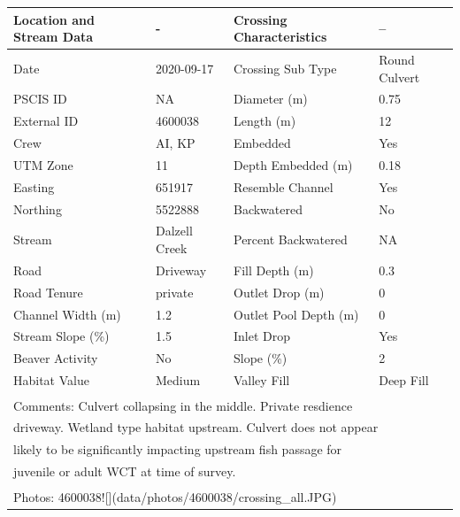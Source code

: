 \documentclass[
]{book}
\begin{document}
\begin{tabular}{l|l|l|l}
\hline
Location and Stream Data & - & Crossing Characteristics & --\\
\hline
Date & 2020-09-17 & Crossing Sub Type & Round Culvert\\
\hline
PSCIS ID & NA & Diameter (m) & 0.75\\
\hline
External ID & 4600038 & Length (m) & 12\\
\hline
Crew & AI, KP & Embedded & Yes\\
\hline
UTM Zone & 11 & Depth Embedded (m) & 0.18\\
\hline
Easting & 651917 & Resemble Channel & Yes\\
\hline
Northing & 5522888 & Backwatered & No\\
\hline
Stream & Dalzell Creek & Percent Backwatered & NA\\
\hline
Road & Driveway & Fill Depth (m) & 0.3\\
\hline
Road Tenure & private & Outlet Drop (m) & 0\\
\hline
Channel Width (m) & 1.2 & Outlet Pool Depth (m) & 0\\
\hline
Stream Slope (\%) & 1.5 & Inlet Drop & Yes\\
\hline
Beaver Activity & No & Slope (\%) & 2\\
\hline
Habitat Value & Medium & Valley Fill & Deep Fill\\
\hline
\multicolumn{4}{l}{\textsuperscript{} Comments: Culvert collapsing in the middle. Private resdience}\\
\multicolumn{4}{l}{driveway. Wetland type habitat upstream. Culvert does not appear}\\
\multicolumn{4}{l}{likely to be significantly impacting upstream fish passage for}\\
\multicolumn{4}{l}{juvenile or adult WCT at time of survey.}\\
\multicolumn{4}{l}{\textsuperscript{} Photos: 4600038![](data/photos/4600038/crossing\_all.JPG)}\\
\end{tabular}
\end{document}
